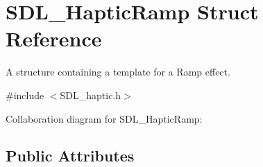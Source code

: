 \hypertarget{struct_s_d_l___haptic_ramp}{}\section{S\+D\+L\+\_\+\+Haptic\+Ramp Struct Reference}
\label{struct_s_d_l___haptic_ramp}


A structure containing a template for a Ramp effect.  




{\ttfamily \#include $<$S\+D\+L\+\_\+haptic.\+h$>$}



Collaboration diagram for S\+D\+L\+\_\+\+Haptic\+Ramp\+:
\subsection*{Public Attributes}
